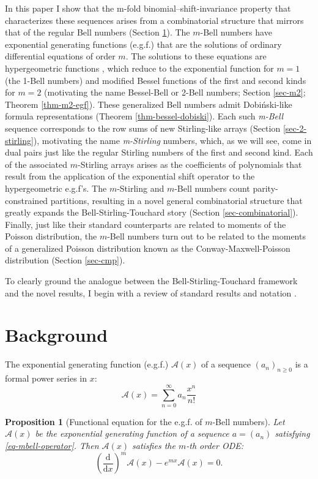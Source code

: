 \documentclass[a4paper]{amsart}
\newtheorem{proposition}[theorem]{Proposition}
\begin{document}
In this paper I show that the m-fold binomial–shift-invariance property that characterizes these sequences arises from a combinatorial structure that mirrors that of the regular Bell numbers (Section \ref{sec-background}). The $m$-Bell numbers have exponential generating functions (e.g.f.) that are the solutions of ordinary differential equations of order $m$. The solutions to these equations are hypergeometric functions \cite{tauberGeneralizationsExponentialFunction1960}, which reduce to the exponential function for $m=1$ (the 1-Bell numbers) and modified Bessel functions of the first and second kinds for $m=2$ (motivating the name Bessel-Bell or 2-Bell numbers; Section \ref{sec-m2}; Theorem \ref{thm-m2-egf}). These generalized Bell numbers admit Dobiński-like formula representations (Theorem \ref{thm-bessel-dobiski}). Each such \textit{m-Bell} sequence corresponds to the row sums of new Stirling-like arrays (Section \ref{sec-2-stirling}), motivating the name \textit{m-Stirling }numbers, which, as we will see, come in dual pairs just like the regular Stirling numbers of the first and second kind. Each of the associated $m$-Stirling arrays arises as the coefficients of polynomials that result from the application of the exponential shift operator to the hypergeometric e.g.f's. The $m$-Stirling and $m$-Bell numbers count parity-constrained partitions, resulting in a novel general combinatorial structure that greatly expands the Bell-Stirling-Touchard story (Section \ref{sec-combinatorial}). Finally, just like their standard counterparts are related to moments of the Poisson distribution, the $m$-Bell numbers turn out to be related to the moments of a generalized Poisson distribution known as the Conway-Maxwell-Poisson distribution \cite{shmueliUsefulDistributionFitting2005} (Section \ref{sec-cmp}).

To clearly ground the analogue between the Bell-Stirling-Touchard framework and the novel results, I begin with a review of standard results and notation \cite{comtet1974, sándor2004}.

\section{Background}\label{sec-background}
\noindent The exponential generating function (e.g.f.) $\mathcal{A}(x)$ of a sequence $(a_n)_{n \geq 0}$ is a formal power series in $x$:
\[
\mathcal{A}(x) = \sum_{n=0}^\infty a_n \frac{x^n}{n!}
\]

\begin{proposition}[Functional equation for the e.g.f. of $m$-Bell numbers]\label{prop:mbell-egf}
Let $\mathcal{A}(x)$ be the exponential generating function of a sequence \( a = (a_n) \) satisfying \eqref{eq-mbell-operator}.
Then \( \mathcal{A}(x) \) satisfies the $m$-th order ODE:
\[
\left(\frac{\mathrm{d}}{\mathrm{d}x}\right)^m \mathcal{A}(x) - e^{mx} \mathcal{A}(x) = 0.
\]
\end{proposition}
\end{document}

